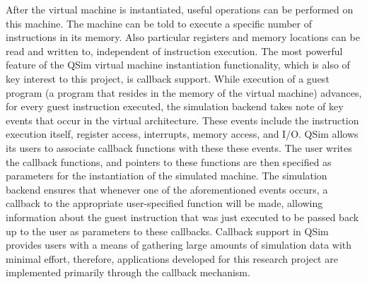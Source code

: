 \documentclass[letterpaper,10pt,twocolumn]{article}
\begin{document}
After the virtual machine is instantiated, useful operations can be performed on 
this machine. The machine can be told to execute a specific number of 
instructions in its memory. Also particular registers and memory locations can 
be read and written to, independent of instruction execution.
The most powerful feature of the QSim virtual machine instantiation functionality, which is also of key interest to this project, is callback support. While execution of a guest program (a program that resides in the memory of the virtual machine) advances, for every guest instruction executed, the simulation backend takes note of key events that occur in the virtual architecture. These events include the instruction execution itself, register access, interrupts, memory access, and I/O. QSim allows its users to associate callback functions with these these events. The user writes the callback functions, and pointers to these functions are then specified as parameters for the instantiation of the simulated machine. The simulation backend ensures that whenever one of the aforementioned events occurs, a callback to the appropriate user-specified function will be made, allowing information about the guest instruction that was just executed to be passed back up to the user as parameters to these callbacks. Callback support in QSim provides users with a means of gathering large amounts of simulation data with minimal effort, therefore, applications developed for this research project are implemented primarily through the callback mechanism.
\end{document}
